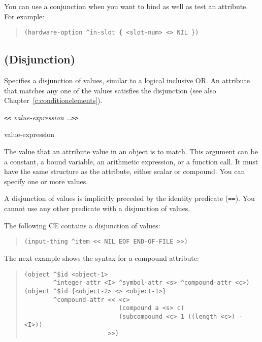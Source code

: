 You can use a conjunction when you want to bind as well as test an
attribute. For example:

\begin{quote}
\begin{verbatim}
(hardware-option ^in-slot { <slot-num> <> NIL })
\end{verbatim}
\end{quote}


\subsection{\co{<<} \co{>>} (Disjunction)}

Specifies a disjunction of values, similar to a logical inclusive
OR. An attribute that matches any one of the values satisfies the
disjunction (see also Chapter~\ref{c:conditionelements}).

\Format

\verb|<<| \it{value-expression} \ldots\verb|>>|

\begin{operands}
\item[value-expression]

  The value that an attribute value in an object is to match.  This
  argument can be a constant, a bound variable, an arithmetic
  expression, or a function call. It must have the same structure as
  the attribute, either scalar or compound.  You can specify one or
  more values.

  A disjunction of values is implicitly preceded by the identity
  predicate (\verb|==|). You cannot use any other predicate with a
  disjunction of values.
\end{operands}

\Example

The following CE contains a disjunction of values:

\begin{quote}
\begin{verbatim}
(input-thing ^item << NIL EOF END-OF-FILE >>)
\end{verbatim}
\end{quote}

The next example shows the syntax for a compound attribute:

\begin{quote}
\begin{verbatim}
(object ^$id <object-1>
        ^integer-attr <I> ^symbol-attr <s> ^compound-attr <c>)
(object ^$id {<object-2> <> <object-1>}
        ^compound-attr << <c>
                          (compound a <s> c)
                          (subcompound <c> 1 ((length <c>) - <I>))
                       >>)
\end{verbatim}
\end{quote}

